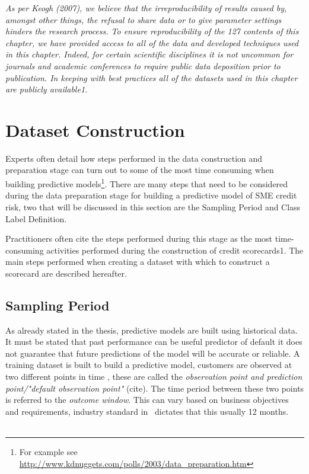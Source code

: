 \textit{As per Keogh (2007), we believe that the irreproducibility
	of results caused by, amongst other things, the refusal to share data or to give
	parameter settings hinders the research process. To ensure reproducibility of the
	127
	contents of this chapter, we have provided access to all of the data and developed
	techniques used in this chapter. Indeed, for certain scientific disciplines it is not
	uncommon for journals and academic conferences to require public data deposition
	prior to publication. In keeping with best practices all of the datasets used in this
	chapter are publicly available1. \citep{kennedy_credit_2013}}


\section{Dataset Construction}\label{sec:datasetConstruction}

Experts often detail how steps performed in the data construction and preparation stage can turn out to some of the most time consuming  when building predictive models\footnote{For example see \url{http://www.kdnuggets.com/polls/2003/data_preparation.htm}}. There are many steps that need to be considered during the data preparation stage for building a predictive model of SME credit risk, two that will be discussed in this section are the Sampling Period and Class Label Definition. 

Practitioners often cite the steps performed during this stage as the most time-consuming
activities performed during the construction of credit scorecards1. The
main steps performed when creating a dataset with which to construct a scorecard
are described hereafter.

\subsection{Sampling Period}
As already stated in the thesis, predictive models are built using historical data. It must be stated that past performance can be useful predictor of default it does not guarantee that future predictions of the model will be accurate or reliable. A training dataset is built to build a predictive model, customers are observed at two different points in time \citep{martens_credit_2010}, these are called the \textit{observation point and prediction point/"default observation point"} (cite). The time period between these two points is referred to the \textit{outcome window}. This can vary based on business objectives and requirements, industry standard in \subjectname\ dictates that this usually 12 months. \\\\

